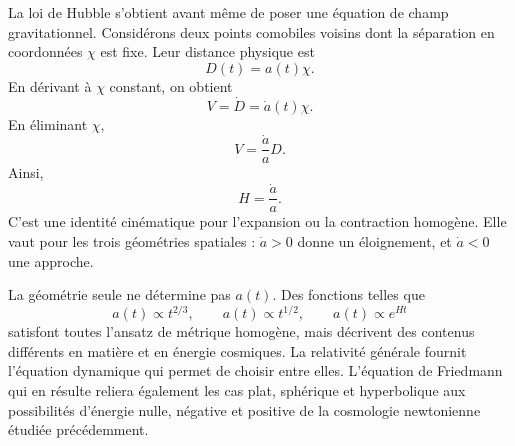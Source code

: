 La loi de Hubble s’obtient avant même de poser une équation de champ gravitationnel. Considérons deux points comobiles voisins dont la séparation en coordonnées \(\chi\) est fixe. Leur distance physique est
\begin{equation}
D(t)=a(t)\chi.
\label{eq:c03-comoving-distance}
\end{equation}
En dérivant à \(\chi\) constant, on obtient
\begin{equation}
V=\dot D=\dot a(t)\chi.
\end{equation}
En éliminant \(\chi\),
\begin{equation}
V = \frac{\dot a}{a} D.
\label{eq:c03-hubble-law}
\end{equation}
Ainsi,
\begin{equation}
H = \frac{\dot a}{a}.
\label{eq:c03-hubble-parameter}
\end{equation}
C’est une identité cinématique pour l’expansion ou la contraction homogène. Elle vaut pour les trois géométries spatiales : \(\dot a>0\) donne un éloignement, et \(\dot a<0\) une approche.

La géométrie seule ne détermine pas \(a(t)\). Des fonctions telles que
\begin{equation}
a(t)\propto t^{2/3},
\qquad
a(t)\propto t^{1/2},
\qquad
a(t)\propto e^{Ht}
\end{equation}
satisfont toutes l’ansatz de métrique homogène, mais décrivent des contenus différents en matière et en énergie cosmiques. La relativité générale fournit l’équation dynamique qui permet de choisir entre elles. L’équation de Friedmann qui en résulte reliera également les cas plat, sphérique et hyperbolique aux possibilités d’énergie nulle, négative et positive de la cosmologie newtonienne étudiée précédemment.

\begin{classroomqa}
\end{classroomqa}

